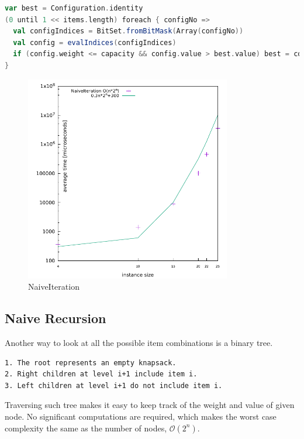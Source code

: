 \documentclass[a4paper,10pt,twocolumn]{article}
\begin{document}
\begin{lstlisting}[frame=tlrb,basicstyle=\scriptsize,language=scala,label=naiveIterationCode,caption=NaiveIteration]
var best = Configuration.identity
(0 until 1 << items.length) foreach { configNo =>
  val configIndices = BitSet.fromBitMask(Array(configNo))
  val config = evalIndices(configIndices)
  if (config.weight <= capacity && config.value > best.value) best = config
}
\end{lstlisting}

\begin{figure}[H]
  \begin{center}
        \hspace*{-1.2cm}\includegraphics[width=9cm,height=9cm]{gnuplot/pdf/NaiveIteration.pdf}
  \end{center}
  \caption{NaiveIteration}\label{naiveIterationPlot}
\end{figure}

\subsection{Naive Recursion} \label{naiverec}
Another way to look at all the possible item combinations is a binary tree.
\begin{lstlisting}
1. The root represents an empty knapsack.
2. Right children at level i+1 include item i.
3. Left children at level i+1 do not include item i.
\end{lstlisting}
Traversing such tree makes it easy to keep track of the weight and value of given node. No significant computations are
required, which makes the worst case complexity the same as the number of nodes, $\mathcal{O}(2^n)$.
\end{document}
